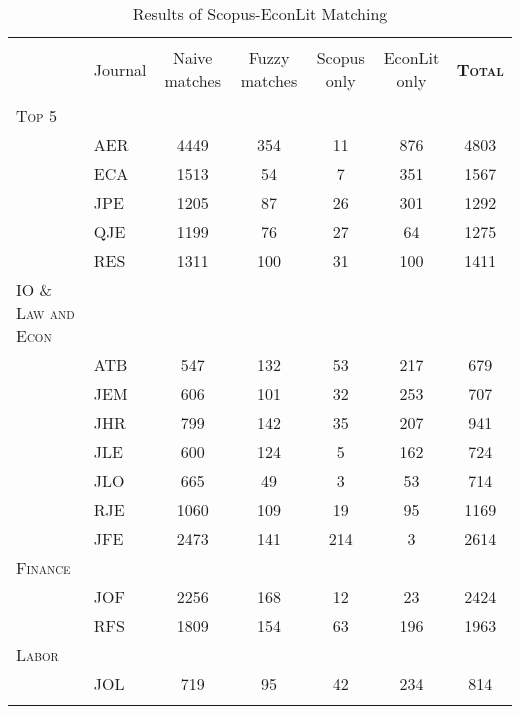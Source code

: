 
\begin{table}[h] \centering 
  \caption{Results of Scopus-EconLit Matching} 
  \label{} 
\begin{tabular}{@{\extracolsep{5pt}} llccccc} 
\\[-1.8ex]\hline 
\hline \\[-1.8ex] 
 & Journal & Naive matches & Fuzzy matches & Scopus only & EconLit only &  \textsc{\textbf{Total}} \\ 
\hline \\[-1.8ex] 
\textsc{Top 5} & & & & & & \\ 
 & AER & 4449 & 354 & 11 & 876 & 4803 \\ 
 & ECA & 1513 & 54 & 7 & 351 & 1567 \\ 
 & JPE & 1205 & 87 & 26 & 301 & 1292 \\ 
 & QJE & 1199 & 76 & 27 & 64 & 1275 \\ 
 & RES & 1311 & 100 & 31 & 100 & 1411 \\ 
\textsc{IO \& Law and Econ} & & & & & & \\ 
 & ATB & 547 & 132 & 53 & 217 & 679 \\ 
 & JEM & 606 & 101 & 32 & 253 & 707 \\ 
 & JHR & 799 & 142 & 35 & 207 & 941 \\ 
 & JLE & 600 & 124 & 5 & 162 & 724 \\ 
 & JLO & 665 & 49 & 3 & 53 & 714 \\ 
 & RJE & 1060 & 109 & 19 & 95 & 1169 \\ 
 & JFE & 2473 & 141 & 214 & 3 & 2614 \\ 
\textsc{Finance} & & & & & & \\ 
 & JOF & 2256 & 168 & 12 & 23 & 2424 \\ 
 & RFS & 1809 & 154 & 63 & 196 & 1963 \\ 
\textsc{Labor} & & & & & & \\ 
 & JOL & 719 & 95 & 42 & 234 & 814 \\ 
\hline \\[-1.8ex] 
\end{tabular} 
\end{table} 
